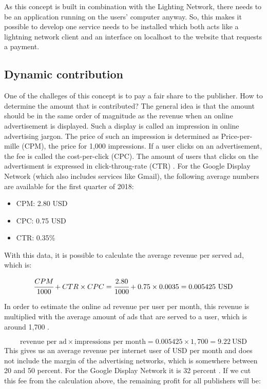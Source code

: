 As this concept is built in combination with the Lighting Network, there needs to be an application running on the users' computer anyway. So, this makes it possible to develop one service needs to be installed which both acts like a lightning network client and an interface on localhost to the website that requests a payment.

\subsection{Dynamic contribution}

One of the challeges of this concept is to pay a fair share to the publisher. How to determine the amount that is contributed? The general idea is that the amount should be in the same order of magnitude as the revenue when an online advertisement is displayed. Such a display is called an impression in online advertising jargon. The price of such an impression is determined as Price-per-mille (CPM), the price for 1,000 impressions. If a user clicks on an advertisement, the fee is called the cost-per-click (CPC). The amount of users that clicks on the advertisment is expressed in click-throug-rate (CTR) \cite{evans2009online}. For the Google Display Network (which also includes services like Gmail), the following average numbers are available for the first quarter of 2018: 

\begin{itemize}
  \item CPM: 2.80 USD
  \item CPC: 0.75 USD
  \item CTR: 0.35\%
\end{itemize}

\noindent With this data, it is possible to calculate the average revenue per served ad, which is:

\begin{equation}
\cfrac{CPM}{1000} + CTR \times CPC = \cfrac{2.80}{1000} + 0.75 \times 0.0035 = 0.005425 ~\text{USD}
\end{equation}

\noindent In order to estimate the online ad revenue per user per month, this revenue is multiplied with the average amount of ads that are served to a user, which is around 1,700 \cite{papadopoulos2018cost}. 

\begin{equation}
  \text{revenue per ad} \times \text{impressions per month} = 0.005425 \times 1,700 = 9.22 ~\text{USD}
\end{equation}
This gives us an average revenue per internet user of USD per month and does not include the margin of the advertising networks, which is somewhere between 20 and 50 percent. For the Google Display Network it is 32 percent \cite{googlefee}. If we cut this fee from the calculation above, the remaining profit for all publishers will be:


